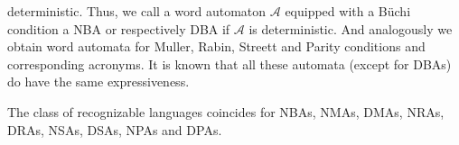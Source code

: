 deterministic. Thus, we call a word automaton $\mathcal{A}$ equipped with a
Büchi condition a \ac{NBA} or respectively \ac{DBA} if
$\mathcal{A}$ is deterministic. And analogously we obtain word automata for
Muller, Rabin, Streett and Parity conditions and corresponding acronyms.
It is known that all these automata (except for \acp{DBA}) do have the same
expressiveness.
\begin{theorem}
  \cite[Proposition 5.3, Theorem 5.4, Proposition 5.6]{LangAutoLog}
  The class of recognizable languages coincides for \acp{NBA}, \acp{NMA},
  \acp{DMA}, \acp{NRA}, \acp{DRA}, \acp{NSA}, \acp{DSA}, \acp{NPA} and
  \acp{DPA}.
\end{theorem}

